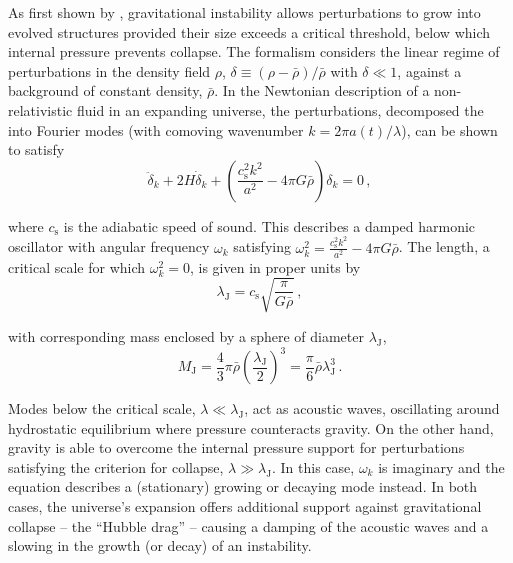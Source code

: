 As first shown by \citet{1902RSPTA.199....1J}, gravitational instability allows perturbations to grow into evolved structures provided their size exceeds a critical threshold, below which internal pressure prevents collapse. The \citeauthor{1902RSPTA.199....1J} formalism considers the linear regime of perturbations in the density field $\rho$, $\delta \equiv (\rho - \bar{\rho}) / \bar{\rho}$ with $\delta \ll 1$, against a background of constant density, $\bar{\rho}$. In the Newtonian description of a non-relativistic fluid in an expanding universe, the perturbations, decomposed the into Fourier modes (with comoving wavenumber $k = 2\pi a(t) / \lambda$), can be shown to satisfy
\begin{equation}
    \label{chIeq:Jeans_instability}
    \ddot{\delta}_k + 2 H \dot{\delta}_k + \left( \frac{c_\text{s}^2 k^2}{a^2} - 4 \pi G \bar{\rho} \right) \delta_k = 0 \, ,
\end{equation}

\noindent where $c_\text{s}$ is the adiabatic speed of sound. This describes a damped harmonic oscillator with angular frequency $\omega_k$ satisfying $\omega_k^2 = \frac{c_\text{s}^2 k^2}{a^2} - 4 \pi G \bar{\rho}$. The \citeauthor{1902RSPTA.199....1J} length, a critical scale for which $\omega_k^2 = 0$, is given in proper units by
\begin{equation}
    \label{chIeq:Jeans_length}
    \lambda_\text{J} = c_\text{s} \sqrt{\frac{\pi}{G \bar{\rho}}} \, ,
\end{equation}

\noindent with corresponding \citeauthor{1902RSPTA.199....1J} mass enclosed by a sphere of diameter $\lambda_\text{J}$,
\begin{equation}
    \label{chIeq:Jeans_mass}
    M_\text{J} = \frac{4}{3} \pi \bar{\rho} \left( \frac{\lambda_\text{J}}{2} \right)^3 = \frac{\pi}{6} \bar{\rho} \lambda_\text{J}^3 \, .
\end{equation}

Modes below the critical scale, $\lambda \ll \lambda_\text{J}$, act as acoustic waves, oscillating around hydrostatic equilibrium where pressure counteracts gravity. On the other hand, gravity is able to overcome the internal pressure support for perturbations satisfying the criterion for collapse, $\lambda \gg \lambda_\text{J}$. In this case, $\omega_k$ is imaginary and the equation describes a (stationary) growing or decaying mode instead. In both cases, the universe's expansion offers additional support against gravitational collapse -- the ``Hubble drag'' -- causing a damping of the acoustic waves and a slowing in the growth (or decay) of an instability.

